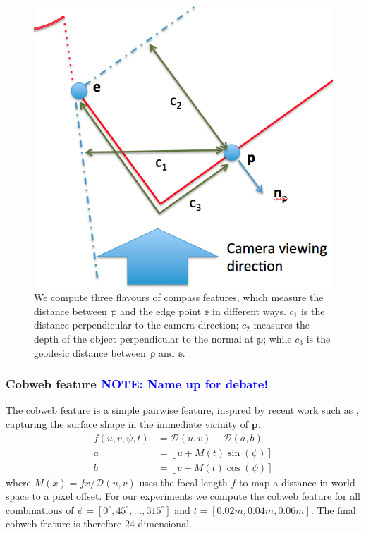 \documentclass[10pt,twocolumn,letterpaper]{article}
\newcommand{\degree}{^{\circ}}
\newcommand{\rgbdimage}{\mathcal{D}}
\newcommand{\point}{\mathbf{p}}
\newcommand{\note}[1]{\textcolor{blue}{NOTE: #1}}
\begin{document}
\begin{figure}
    \centering 
    \includegraphics[width=1.0\columnwidth]{compass_features}
    \caption{We compute three flavours of compass features, which measure the distance between $\mathbb{p}$ and the edge point $\mathbb{e}$ in different ways. $c_1$ is the distance perpendicular to the camera direction; $c_2$ measures the depth of the object perpendicular to the normal at $\mathbb{p}$; while $c_3$ is the geodesic distance between $\mathbb{p}$ and $\mathbb{e}$.}
    \label{fig:compass_features}
\end{figure}


\subsubsection{Cobweb feature \note{Name up for debate!}}
The cobweb feature is a simple pairwise feature, inspired by recent work such as \cite{shotton-cvpr-2011}, capturing the surface shape in the immediate vicinity of $\point$.
\begin{align}
f(u, v, \psi, t) &= \rgbdimage(u, v) - \rgbdimage(a, b) \\
a &= \left\lfloor u + M(t)  \sin(\psi) \right\rceil \\
b &= \left\lfloor v + M(t)  \cos(\psi) \right\rceil
\end{align}
where $M(x) = fx / \rgbdimage(u, v)$ uses the focal length $f$ to map a distance in world space to a pixel offset. For our experiments we compute the cobweb feature for all combinations of $\psi = [0\degree, 45\degree, \ldots, 315\degree]$ and $t = [0.02m, 0.04m, 0.06m]$.
The final cobweb feature is therefore 24-dimensional.
\end{document}
